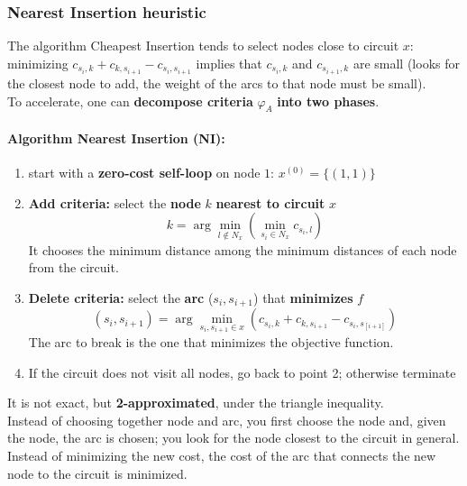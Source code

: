 \documentclass[11pt]{article}
\begin{document}
	\newpage
	
	\subsubsection{Nearest Insertion heuristic}
	The algorithm Cheapest Insertion tends to select nodes close to circuit $x$: minimizing $c_{s_i ,k} + c_{k,s_{i+1}} - c_{s_i ,s_{i+1}}$ implies that $c_{s_i ,k}$ and $c_{s_{i+1},k}$ are small (looks for the closest node to add, the weight of the arcs to that node must be small).\\
	
	To accelerate, one can \textbf{decompose criteria} $\varphi_A$ \textbf{into two phases}.\\
	
	\paragraph{Algorithm Nearest Insertion (NI):}
	\begin{enumerate}
		\item start with a \textbf{zero-cost self-loop} on node $1$: $x^{(0)} = \{(1, 1)\}$
		
		\item \textbf{Add criteria:} select the \textbf{node} $k$ \textbf{nearest to circuit} $x$
		$$ k = \arg \min_{l \notin N_x} \left(\min_{s_i \in N_x} c_{s_i, l} \right) $$
		It chooses the minimum distance among the minimum distances of each node from the circuit.
		
		\item \textbf{Delete criteria:} select the \textbf{arc} ($s_i , s_{i+1}$) that \textbf{minimizes} $f$
		$$ (s_i, s_{i+1}) = \arg \min_{s_i, s_{i+1} \in x} \left(c_{s_i, k} + c_{k, s_{i+1}} - c_{s_i, s_[i+1]}\right) $$
		The arc to break is the one that minimizes the objective function.
		
		\item If the circuit does not visit all nodes, go back to point 2; otherwise terminate
	\end{enumerate}
	
	It is not exact, but \textbf{2-approximated}, under the triangle inequality.\\
	
	Instead of choosing together node and arc, you first choose the node and, given the node, the arc is chosen; you look for the node closest to the circuit in general. \\
	Instead of minimizing the new cost, the cost of the arc that connects the new node to the circuit is minimized.\\
	
\end{document}
